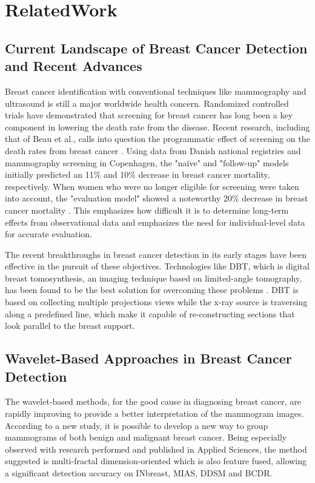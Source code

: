 \chapter{RelatedWork}
\label{chap2}
\section{Current Landscape of Breast Cancer Detection and Recent Advances}
Breast cancer identification with conventional techniques like mammography and ultrasound is still a major worldwide health concern. Randomized controlled trials have demonstrated that screening for breast cancer has long been a key component in lowering the death rate from the disease. Recent research, including that of Beau et al., calls into question the programmatic effect of screening on the death rates from breast cancer \cite{Mortality}. Using data from Danish national registries and mammography screening in Copenhagen, the "naïve" and "follow-up" models initially predicted an 11\% and 10\% decrease in breast cancer mortality, respectively. When women who were no longer eligible for screening were taken into account, the "evaluation model" showed a noteworthy 20\% decrease in breast cancer mortality \cite{Mortality}. This emphasizes how difficult it is to determine long-term effects from observational data and emphasizes the need for individual-level data for accurate evaluation. 

The recent breakthroughs in breast cancer detection in its early stages have been effective in the pursuit of these objectives. Technologies like DBT, which is digital breast tomosynthesis, an imaging technique based on limited-angle tomography, has been found to be the best solution for overcoming these problems \cite{Tomosynthesis}. DBT is based on collecting multiple projections views while the x-ray source is traversing along a predefined line, which make it capable of re-constructing sections that look parallel to the breast support.
\section{Wavelet-Based Approaches in Breast Cancer Detection}
The wavelet-based methods, for the good cause in diagnosing breast cancer, are rapidly improving to provide a better interpretation of the mammogram images. According to a new study, it is possible to develop a new way to group mammograms of both benign and malignant breast cancer. Being especially observed with research performed and published in Applied Sciences, the method suggested is multi-fractal dimension-oriented which is also feature fused, allowing a significant detection accuracy on INbreast, MIAS, DDSM and BCDR. \cite{zebari2021breast}

